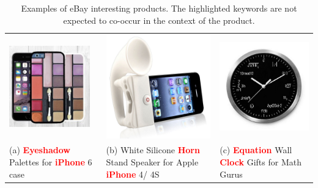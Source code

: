 \begin{table}[t]
\caption{Examples of eBay interesting products. The highlighted keywords are not expected to co-occur in the context of the product.}
\label{tab:ebay-interesting-products}
\begin{center}
\begin{tabular}{LLL}
\includegraphics[height=3.5cm]{figures/eyeshadow-iphone-case.jpg}&\includegraphics[height=4.5cm]{figures/horn-iphone-speaker.jpg}&\includegraphics[height=4.0cm]{figures/geeky-clock.jpg}\\
(a) \textcolor{red}{{\bf Eyeshadow}} Palettes for \textcolor{red}{{\bf iPhone}} 6 case & (b) White Silicone \textcolor{red}{{\bf Horn}} Stand Speaker for Apple \textcolor{red}{{\bf iPhone}} 4/ 4S& (c) \textcolor{red}{{\bf Equation}} Wall \textcolor{red}{{\bf Clock}} Gifts for Math Gurus\\
\end{tabular}
\end{center}
\end{table}